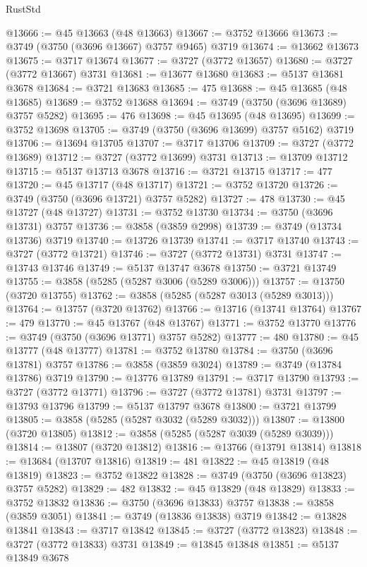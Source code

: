 \begin{lexlean}{RustStd}
\begin{coremodule}
@13666 := @45 @13663 (@48 @13663)
@13667 := @3752 @13666
@13673 := @3749 (@3750 (@3696 @13667) @3757 @9465) @3719
@13674 := @13662 @13673
@13675 := @3717 @13674
@13677 := @3727 (@3772 @13657)
@13680 := @3727 (@3772 @13667) @3731
@13681 := @13677 @13680
@13683 := @5137 @13681 @3678
@13684 := @3721 @13683
@13685 := 475
@13688 := @45 @13685 (@48 @13685)
@13689 := @3752 @13688
@13694 := @3749 (@3750 (@3696 @13689) @3757 @5282)
@13695 := 476
@13698 := @45 @13695 (@48 @13695)
@13699 := @3752 @13698
@13705 := @3749 (@3750 (@3696 @13699) @3757 @5162) @3719
@13706 := @13694 @13705
@13707 := @3717 @13706
@13709 := @3727 (@3772 @13689)
@13712 := @3727 (@3772 @13699) @3731
@13713 := @13709 @13712
@13715 := @5137 @13713 @3678
@13716 := @3721 @13715
@13717 := 477
@13720 := @45 @13717 (@48 @13717)
@13721 := @3752 @13720
@13726 := @3749 (@3750 (@3696 @13721) @3757 @5282)
@13727 := 478
@13730 := @45 @13727 (@48 @13727)
@13731 := @3752 @13730
@13734 := @3750 (@3696 @13731) @3757
@13736 := @3858 (@3859 @2998)
@13739 := @3749 (@13734 @13736) @3719
@13740 := @13726 @13739
@13741 := @3717 @13740
@13743 := @3727 (@3772 @13721)
@13746 := @3727 (@3772 @13731) @3731
@13747 := @13743 @13746
@13749 := @5137 @13747 @3678
@13750 := @3721 @13749
@13755 := @3858 (@5285 (@5287 @3006 (@5289 @3006)))
@13757 := @13750 (@3720 @13755)
@13762 := @3858 (@5285 (@5287 @3013 (@5289 @3013)))
@13764 := @13757 (@3720 @13762)
@13766 := @13716 (@13741 @13764)
@13767 := 479
@13770 := @45 @13767 (@48 @13767)
@13771 := @3752 @13770
@13776 := @3749 (@3750 (@3696 @13771) @3757 @5282)
@13777 := 480
@13780 := @45 @13777 (@48 @13777)
@13781 := @3752 @13780
@13784 := @3750 (@3696 @13781) @3757
@13786 := @3858 (@3859 @3024)
@13789 := @3749 (@13784 @13786) @3719
@13790 := @13776 @13789
@13791 := @3717 @13790
@13793 := @3727 (@3772 @13771)
@13796 := @3727 (@3772 @13781) @3731
@13797 := @13793 @13796
@13799 := @5137 @13797 @3678
@13800 := @3721 @13799
@13805 := @3858 (@5285 (@5287 @3032 (@5289 @3032)))
@13807 := @13800 (@3720 @13805)
@13812 := @3858 (@5285 (@5287 @3039 (@5289 @3039)))
@13814 := @13807 (@3720 @13812)
@13816 := @13766 (@13791 @13814)
@13818 := @13684 (@13707 @13816)
@13819 := 481
@13822 := @45 @13819 (@48 @13819)
@13823 := @3752 @13822
@13828 := @3749 (@3750 (@3696 @13823) @3757 @5282)
@13829 := 482
@13832 := @45 @13829 (@48 @13829)
@13833 := @3752 @13832
@13836 := @3750 (@3696 @13833) @3757
@13838 := @3858 (@3859 @3051)
@13841 := @3749 (@13836 @13838) @3719
@13842 := @13828 @13841
@13843 := @3717 @13842
@13845 := @3727 (@3772 @13823)
@13848 := @3727 (@3772 @13833) @3731
@13849 := @13845 @13848
@13851 := @5137 @13849 @3678

\end{coremodule}
\end{lexlean}
